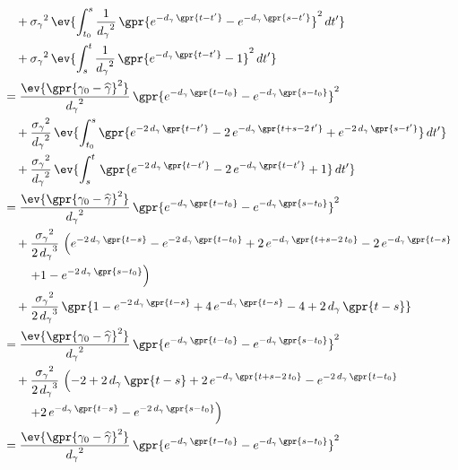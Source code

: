 \begin{align}
    		&\quad + {\sigma_{\gamma}}^2\,\ev{\int_{t_{0}}^{s} \frac{1}{{d_{\gamma}}^2}\,\gpr{e^{-d_{\gamma}\,\gpr{t - t'}} - e^{-d_{\gamma}\,\gpr{s - t'}}}^2\,dt'} \nonumber \\
    		&\quad + {\sigma_{\gamma}}^2\,\ev{\int_{s}^{t} \frac{1}{{d_{\gamma}}^2}\,\gpr{e^{-d_{\gamma}\,\gpr{t-t'}}-1}^2\,dt'} \nonumber \\
    	&= \frac{\ev{\gpr{\gamma_{0} - \widehat{\gamma}}^2}}{{d_{\gamma}}^2}\,\gpr{e^{-d_{\gamma}\,\gpr{t - t_{0}}} - e^{-d_{\gamma}\,\gpr{s - t_{0}}}}^2 \nonumber \\
    		&\quad + \frac{{\sigma_{\gamma}}^2}{{d_{\gamma}}^2}\,\ev{\int_{t_{0}}^{s} \gpr{e^{-2\,d_{\gamma}\,\gpr{t - t'}} - 2\,e^{-d_{\gamma}\,\gpr{t + s - 2\,t'}} + e^{-2\,d_{\gamma}\,\gpr{s - t'}}}\,dt'} \nonumber \\
    		&\quad + \frac{{\sigma_{\gamma}}^2}{{d_{\gamma}}^2}\,\ev{\int_{s}^{t} \,\gpr{e^{-2\,d_{\gamma}\,\gpr{t-t'}} - 2\,e^{-d_{\gamma}\,\gpr{t-t'}} + 1}\,dt'} \nonumber \\
    	&= \frac{\ev{\gpr{\gamma_{0} - \widehat{\gamma}}^2}}{{d_{\gamma}}^2}\,\gpr{e^{-d_{\gamma}\,\gpr{t - t_{0}}} - e^{-d_{\gamma}\,\gpr{s - t_{0}}}}^2 \nonumber \\
    		&\quad + \frac{{\sigma_{\gamma}}^2}{2\,{d_{\gamma}}^3}\,\left( e^{-2\,d_{\gamma}\,\gpr{t-s}} - e^{-2\,d_{\gamma}\,\gpr{t-t_0}} + 2\,e^{-d_{\gamma}\,\gpr{t + s - 2\,t_0}} - 2\,e^{-d_{\gamma}\,\gpr{t-s}}  \right. \nonumber \\
    			&\qquad \left. + 1 - e^{-2\,d_{\gamma}\,\gpr{s - t_0}} \right) \nonumber \\
    		&\quad + \frac{{\sigma_{\gamma}}^2}{{2\,d_{\gamma}}^3}\,\gpr{1 - e^{-2\,d_{\gamma}\,\gpr{t - s}} + 4\,e^{-d_{\gamma}\,\gpr{t-s}} - 4 + 2\,d_{\gamma}\,\gpr{t-s}} \nonumber \\
    	&= \frac{\ev{\gpr{\gamma_{0} - \widehat{\gamma}}^2}}{{d_{\gamma}}^2}\,\gpr{e^{-d_{\gamma}\,\gpr{t - t_{0}}} - e^{-d_{\gamma}\,\gpr{s - t_{0}}}}^2 \nonumber \\
    		&\quad + \frac{{\sigma_{\gamma}}^2}{2\,{d_{\gamma}}^3}\,\left(-2 + 2\,d_{\gamma}\,\gpr{t-s} + 2\,e^{-d_{\gamma}\,\gpr{t + s - 2\,t_0}}  - e^{-2\,d_{\gamma}\,\gpr{t-t_0}}   \right. \nonumber \\
    			&\qquad \left. + 2\,e^{-d_{\gamma}\,\gpr{t-s}} - e^{-2\,d_{\gamma}\,\gpr{s - t_0}} \right) \nonumber \\
    	&= \frac{\ev{\gpr{\gamma_{0} - \widehat{\gamma}}^2}}{{d_{\gamma}}^2}\,\gpr{e^{-d_{\gamma}\,\gpr{t - t_{0}}} - e^{-d_{\gamma}\,\gpr{s - t_{0}}}}^2 \nonumber \\

\end{align}
